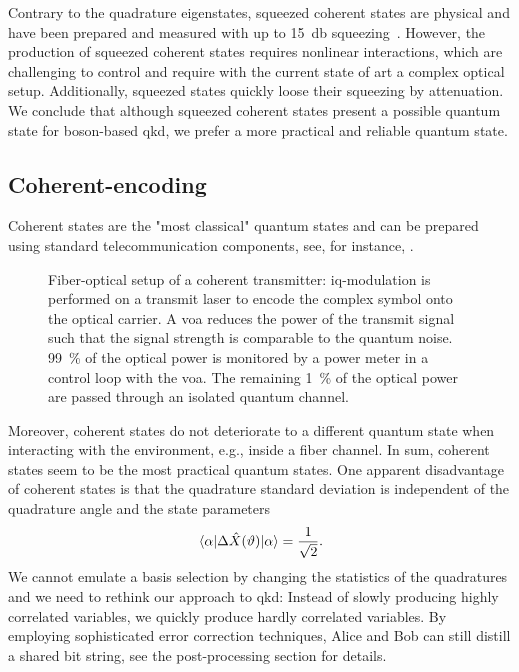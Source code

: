 Contrary to the quadrature eigenstates, squeezed coherent states are physical and have been prepared and measured with up to \SI{15}{\decibel} squeezing~\cite{Vahlbruch2016}.
However, the production of squeezed coherent states requires nonlinear interactions, which are challenging to control and require with the current state of art a complex optical setup.
Additionally, squeezed states quickly loose their squeezing by attenuation.
We conclude that although squeezed coherent states present a possible quantum state for boson-based \gls{qkd}, we prefer a more practical and reliable quantum state.

\FloatBarrier
\subsection{Coherent-encoding}

Coherent states are the "most classical" quantum states and can be prepared using standard telecommunication components, see, for instance, .
\begin{figure}[htb]
	\centering
	
	\caption{Fiber-optical setup of a coherent transmitter: \gls{iq}-modulation is performed on a transmit laser to encode the complex symbol onto the optical carrier. A \gls{voa} reduces the power of the transmit signal such that the signal strength is comparable to the quantum noise. \SI{99}{\percent} of the optical power is monitored by a power meter in a control loop with the \gls{voa}. The remaining \SI{1}{\percent} of the optical power are passed through an isolated quantum channel.}\label{fig:coherent_transmitter}
\end{figure}
Moreover, coherent states do not deteriorate to a different quantum state when interacting with the environment, e.g., inside a fiber channel.
In sum, coherent states seem to be the most practical quantum states.
One apparent disadvantage of coherent states is that the quadrature standard deviation is independent of the quadrature angle and the state parameters~\cite[p.~59]{Barnett2002}
\begin{equation}
	\expval{\Delta\hat{X}(\vartheta)}{\alpha}
	=
	\frac{1}{\sqrt{2}}
	.
\end{equation}
We cannot emulate a basis selection by changing the statistics of the quadratures and we need to rethink our approach to \gls{qkd}:
Instead of slowly producing highly correlated variables, we quickly produce hardly correlated variables.
By employing sophisticated error correction techniques, Alice and Bob can still distill a shared bit string, see the post-processing section for details.

